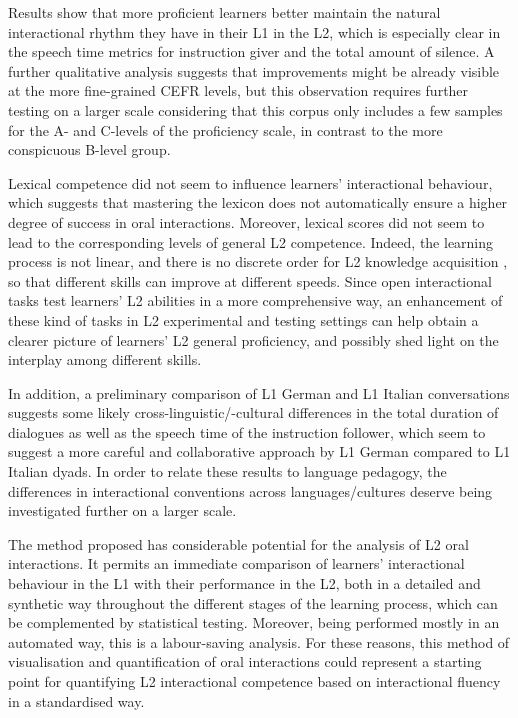 Results show that more proficient learners better maintain the natural interactional rhythm they have in their L1 in the L2, which is especially clear in the speech time metrics for instruction giver and the total amount of silence. A further qualitative analysis suggests that improvements might be already visible at the more fine-grained CEFR levels, but this observation requires further testing on a larger scale considering that this corpus only includes a few samples for the A- and C-levels of the proficiency scale, in contrast to the more conspicuous B-level group.

Lexical competence did not seem to influence learners’ interactional behaviour, which suggests that mastering the lexicon does not automatically ensure a higher degree of success in oral interactions. Moreover, lexical scores did not seem to lead to the corresponding levels of general L2 competence. Indeed, the learning process is not linear, and there is no discrete order for L2 knowledge acquisition \citep{Nava2010}, so that different skills can improve at different speeds. Since open interactional tasks test learners’ L2 abilities in a more comprehensive way, an enhancement of these kind of tasks in L2 experimental and testing settings can help obtain a clearer picture of learners’ L2 general proficiency, and possibly shed light on the interplay among different skills.

In addition, a preliminary comparison of L1 German and L1 Italian conversations suggests some likely cross-linguistic/-cultural differences in the total duration of dialogues as well as the speech time of the instruction follower, which seem to suggest a more careful and collaborative approach by L1 German compared to L1 Italian dyads. In order to relate these results to language pedagogy, the differences in interactional conventions across languages/cultures deserve being investigated further on a larger scale.

The method proposed has considerable potential for the analysis of L2 oral interactions. It permits an immediate comparison of learners’ interactional behaviour in the L1 with their performance in the L2, both in a detailed and synthetic way throughout the different stages of the learning process, which can be complemented by statistical testing. Moreover, being performed mostly in an automated way, this is a labour-saving analysis. For these reasons, this method of visualisation and quantification of oral interactions could represent a starting point for quantifying L2 interactional competence based on interactional fluency in a standardised way.

